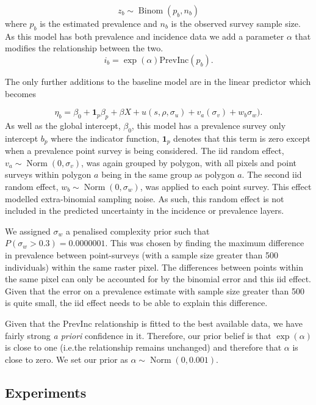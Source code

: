 \documentclass[10pt,letterpaper]{article}
\begin{document}
$$z_b \sim \operatorname{Binom}(p_b, n_b) $$
where $p_b$ is the estimated prevalence and $n_b$ is the observed survey sample size. 
As this model has both prevalence and incidence data we add a parameter $\alpha$ that modifies the relationship between the two.
$$i_b = \exp(\alpha)\mathrm{PrevInc}(p_b).$$

The only further additions to the baseline model are in the linear predictor which becomes 

$$\eta_b = \beta_0 + \mathbf{1}_p\beta_p +  \beta X  + u(s, \rho, \sigma_u) + v_a(\sigma_v) + w_b\sigma_w).$$
As well as the global intercept, $\beta_0$, this model has a prevalence survey only intercept $b_p$ where the indicator function, $\mathbf{1}_p$ denotes that this term is zero except when a prevalence point survey is being considered.
The iid random effect, $v_a \sim \operatorname{Norm}(0, \sigma_v)$, was again grouped by polygon, with all pixels and point surveys within polygon $a$ being in the same group as polygon $a$.
The second iid random effect, $w_b \sim \operatorname{Norm}(0, \sigma_w)$, was applied to each point survey.
This effect modelled extra-binomial sampling noise.
As such, this random effect is not included in the predicted uncertainty in the incidence or prevalence layers.

We assigned $\sigma_w$ a penalised complexity prior such that $P(\sigma_w > 0.3) = 0.0000001$. 
This was chosen by finding the maximum difference in prevalence between point-surveys (with a sample size greater than 500 individuals) within the same raster pixel.
The differences between points within the same pixel can only be accounted for by the binomial error and this iid effect.
Given that the error on a prevalence estimate with sample size greater than 500 is quite small, the iid effect needs to be able to explain this difference.

Given that the PrevInc relationship is fitted to the best available data, we have fairly strong \emph{a priori} confidence in it.
Therefore, our prior belief is that $\exp(\alpha)$ is close to one (i.e.\thinspace the relationship remains unchanged) and therefore that $\alpha$ is close to zero.
We set our prior as $\alpha \sim \operatorname{Norm}(0, 0.001)$.


\subsection*{Experiments}
\end{document}
